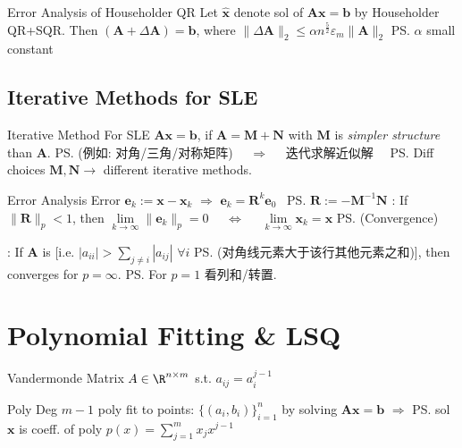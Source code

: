 \documentclass{note}
\begin{document}
\begin{MyTh}{Error Analysis of Householder QR}
    Let $\widehat{\mathbf{x}}$ denote sol of $\mathbf{Ax}=\mathbf{b}$ by Householder QR+SQR. \quad Then $(\mathbf{A}+\Delta\mathbf{A})=\mathbf{b}$, where $\|\Delta\mathbf{A}\|_2\leq \alpha n^{\frac{5}{2}}\varepsilon_m\|\mathbf{A}\|_2$ \ps{$\alpha$ small constant} 
\end{MyTh}


\subsection{Iterative Methods for SLE}

\begin{MyTh}{Iterative Method}
  For SLE $\mathbf{Ax}=\mathbf{b}$, if $\mathbf{A}=\mathbf{M}+\mathbf{N}$ with $\mathbf{M}$ is \textit{simpler structure} than $\mathbf{A}$. \ps{\tiny (例如: 对角/三角/对称矩阵)} \ \ $\Rightarrow$ \ \ {\scriptsize 迭代求解近似解} \ \ \ps{\tiny Diff choices $\mathbf{M},\mathbf{N}\to$ different iterative methods.}
\end{MyTh}

\begin{MyTh}{Error Analysis}
  Error $\mathbf{e}_k:=\mathbf{x}-\mathbf{x}_k$ $\Rightarrow$ $\mathbf{e}_k=\mathbf{R}^k\mathbf{e}_0$ \ \ps{\tiny $\mathbf{R}:=-\mathbf{M}^{-1}\mathbf{N}$} \quad {}: If $\|\mathbf{R}\|_p<1$, then $\lim\limits_{k\to\infty}\|\mathbf{e}_k\|_p=0$ \ \ $\Leftrightarrow$ \ \ $\lim\limits_{k\to\infty}\mathbf{x}_k=\mathbf{x}$ \ps{\tiny(Convergence)} \quad {}

  \vspace{-2pt}
  \quad {}: If $\mathbf{A}$ is  [i.e. $|a_{ii}|>\sum_{j\ne i}|a_{ij}|$ $\forall i$ \ps{\tiny (对角线元素大于该行其他元素之和)}], then converges for $p=\infty$. \quad \ps{\tiny For $p=1$ 看列和/转置.}
\end{MyTh}


\section{Polynomial Fitting \& LSQ }

\begin{MyTh}{Vandermonde Matrix}
  $A\in \R^{n\times m}$ s.t. $a_{ij}=a_i^{j-1}$
\end{MyTh}
\begin{MyTh}{Poly}
  Deg $m-1$ poly fit to points: $\{(a_i,b_i)\}_{i=1}^n$ by solving \textit{$\mathbf{Ax}=\mathbf{b}$} $\Rightarrow$ \ps{\tiny sol $\mathbf{x}$ is coeff. of poly $p(x)=\sum_{j=1}^m x_j x^{j-1}$}
\end{MyTh}
\end{document}
